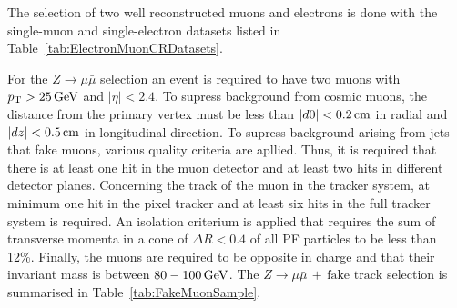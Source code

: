The selection of two well reconstructed muons and electrons is done with the single-muon and single-electron datasets listed in Table~\ref{tab:ElectronMuonCRDatasets}.
\renewcommand{\arraystretch}{1.5}
\begin{table}[!hbt]
\centering
\caption{Datasets used for the determination of the fake rate.}
\label{tab:ElectronMuonCRDatasets}
\end{table}  
For the $Z\rightarrow\mu\bar{\mu}$ selection an event is required to have two muons with $p_{\text{T}}>25\,\text{Ge}\kern-0.06667em\text{V}$ and $|\eta|<2.4$.
To supress background from cosmic muons, the distance from the primary vertex must be less than $|d0|<0.2\,\text{cm}$ in radial and $|dz|<0.5\,\text{cm}$ in longitudinal direction.
To supress background arising from jets that fake muons, various quality criteria are apllied. 
Thus, it is required that there is at least one hit in the muon detector and at least two hits in different detector planes.   
Concerning the track of the muon in the tracker system, at minimum one hit in the pixel tracker and at least six hits in the full tracker system is required. 
An isolation criterium is applied that requires the sum of transverse momenta in a cone of $\Delta R<0.4$ of all PF particles to be less than 12\%.
Finally, the muons are required to be opposite in charge and that their invariant mass is between $80-100\,\text{Ge}\kern-0.06667em\text{V}$.
The $Z\rightarrow\mu\bar{\mu}\,+\,\text{fake track}$ selection is summarised in Table~\ref{tab:FakeMuonSample}.
\renewcommand{\arraystretch}{1.4}
